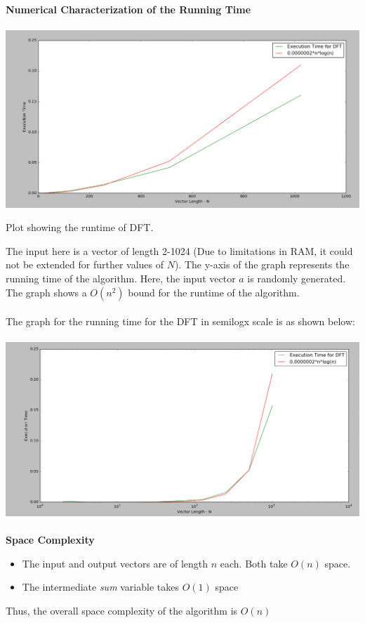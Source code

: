 \documentclass{article}
\begin{document}
\textbf{Numerical Characterization of the Running Time} \\ \\
\includegraphics[scale=0.3]{dft}
\begin{center}
Plot showing the runtime of DFT.  \\
\end{center}
The input here is a vector of length 2-1024 (Due to limitations in RAM, it could not be extended for further values of $N$). The y-axis of the graph represents the running time of the algorithm. Here, the input vector $a$ is randomly generated. The graph shows a $O(n^{2})$ bound for the runtime of the algorithm.\\ \\
The graph for the running time for the DFT in semilogx scale is as shown below: \\ \\
\includegraphics[scale=0.3]{logscale-dft} \\ \\


\textbf{Space Complexity}
\begin{itemize}
\item The input and output vectors are of length $n$ each. Both take $O(n)$ space.
\item The intermediate \textit{sum} variable takes $O(1)$ space
\end{itemize}
Thus, the overall space complexity of the algorithm is $O(n)$
\end{document}
